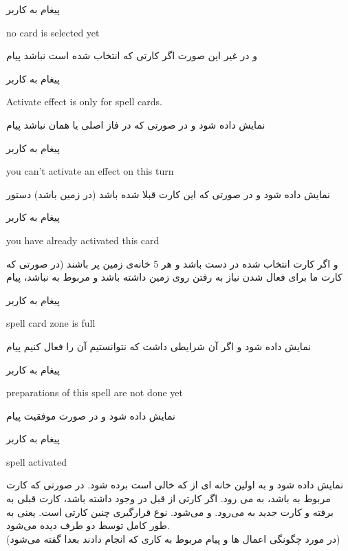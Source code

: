 \documentclass[]{article}
\begin{document}
\begin{mybox}[colback=yellow]{پیغام به کاربر}
	\begin{latin}	
		no card is selected yet
	\end{latin}
\end{mybox}
و در غیر این صورت اگر کارتی که انتخاب شده است  نباشد پیام
\begin{mybox}[colback=yellow]{پیغام به کاربر}
	\begin{latin}	
		Activate effect is only for spell cards.	
	\end{latin}
\end{mybox}
نمایش داده شود و در صورتی که در فاز اصلی یا همان  نباشد پیام
\begin{mybox}[colback=yellow]{پیغام به کاربر}
	\begin{latin}	
		you can’t activate an effect on this turn
	\end{latin}
\end{mybox}
نمایش داده شود و در صورتی که این کارت قبلا  شده باشد (در زمین 
باشد) دستور 
\begin{mybox}[colback=yellow]{پیغام به کاربر}
\begin{latin}	
	you have already activated this card
\end{latin}
\end{mybox}
و اگر کارت انتخاب شده در دست باشد و هر 5 خانه‌ی  زمین پر باشند (در 
صورتی که کارت ما برای فعال شدن نیاز به رفتن روی زمین داشته باشد و مربوط به 
 نباشد، پیام
\begin{mybox}[colback=yellow]{پیغام به کاربر}
\begin{latin}	
	spell card zone is full
\end{latin}
\end{mybox}
نمایش داده شود و اگر آن  شرایطی داشت که نتوانستیم آن را فعال کنیم 
پیام
\begin{mybox}[colback=yellow]{پیغام به کاربر}
	\begin{latin}	
		preparations of this spell are not done yet
	\end{latin}
\end{mybox}
نمایش داده شود و در صورت موفقیت پیام
\begin{mybox}[colback=yellow]{پیغام به کاربر}
	\begin{latin}	
		spell activated
	\end{latin}
\end{mybox}
نمایش داده شود و به اولین خانه ای از  که خالی است برده 
شود. در صورتی که کارت مربوط به  باشد، به  می 
رود. اگر کارتی از قبل در  وجود داشته باشد، کارت قبلی به 
 برفته و کارت جدید به  می‌رود. و  
می‌شود. نوع قرارگیری چنین کارتی  است. یعنی به طور کامل توسط دو طرف 
دیده 
می‌شود.
\\
(در مورد چگونگی اعمال  ها و پیام مربوط به کاری که انجام دادند بعدا 
گفته می‌شود)
\end{document}
